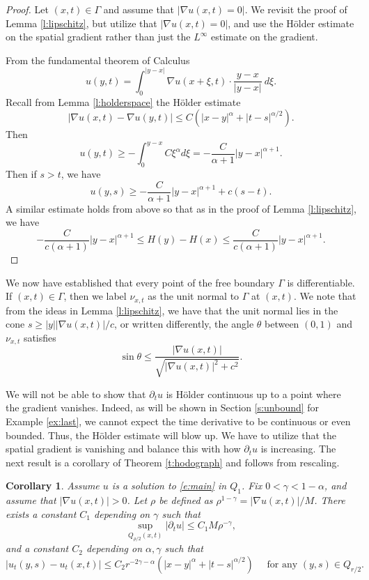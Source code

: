 \documentclass{amsart}
\newtheorem{corollary}[theorem]{Corollary}
\numberwithin{equation}{section}
\begin{document}
\begin{proof}
    Let $(x,t) \in \Gamma$ and assume that $|\nabla u(x,t)=0|$. We revisit the proof of Lemma \ref{l:lipschitz}, but utilize that $|\nabla u(x,t)=0|$, and use the H\"older estimate on the spatial gradient rather than just the $L^{\infty}$ estimate on the gradient. 
    
    From the fundamental theorem of Calculus
    \[
    u(y,t)= \int_0^{|y-x|} \nabla u(x+\xi,t) \cdot \frac{y-x}{|y-x|} \ d \xi. 
    \]
    Recall from Lemma \ref{l:holderspace} the H\"older estimate 
     \[
    |\nabla u(x,t)- \nabla u(y,t)| \leq C(|x-y|^{\alpha}+|t-s|^{\alpha/2}). 
    \]
    Then 
    \[
     u(y,t) \geq -\int_0^{y-x}C\xi^{\alpha} d \xi= -\frac{C}{\alpha+1} |y-x|^{\alpha+1}. 
    \]
    Then if $s>t$, we have 
    \[
    u(y,s)\geq -\frac{C}{\alpha+1} |y-x|^{\alpha+1}+ c(s-t). 
    \]
    A similar estimate holds from above so that as in the proof of Lemma \ref{l:lipschitz}, we have
    \begin{equation} \label{e:zeroalpha}
    -\frac{C}{c(\alpha+1)} |y-x|^{\alpha+1}\leq H(y)-H(x) \leq \frac{C}{c(\alpha+1)} |y-x|^{\alpha+1}. 
    \end{equation}
\end{proof}

We now have established that every point of the free boundary $\Gamma$ is differentiable. 
If $(x,t) \in \Gamma$, then we label $\nu_{x,t}$ as the unit normal to $\Gamma$ at $(x,t)$. We note that from the ideas in Lemma \ref{l:lipschitz}, we have that the unit normal lies in the cone $s\geq |y||\nabla u(x,t)|/c$, or written differently, the angle $\theta$ between $(0,1)$ and $\nu_{x,t}$ satisfies 
\[
\sin \theta\leq \frac{|\nabla u(x,t)|}{\sqrt{|\nabla u(x,t)|^2 + c^2}}. 
\]

We will not be able to show that $\partial_t u$ is H\"older continuous up to a point where the gradient vanishes. Indeed, as will be shown in Section \ref{s:unbound} for Example \ref{ex:last}, we cannot expect the time derivative to be continuous or even bounded. Thus, the H\"older estimate will blow up. We have to utilize that the spatial gradient is vanishing and balance this with how $\partial_t u$ is increasing. The next result is a corollary of Theorem \ref{t:hodograph} and follows from rescaling. 

\begin{corollary} \label{c:rescale}
 Assume $u$ is a solution to \eqref{e:main} in $Q_1$. Fix $0<\gamma<1-\alpha$, and assume that $|\nabla u(x,t)|>0$. Let $\rho$ be defined as $\rho^{1-\gamma}=|\nabla u(x,t)|/M$. There exists a constant $C_1$ depending on $\gamma$ such that 
 \begin{equation} \label{e:rho}
 \sup_{Q_{\rho/2}(x,t)} |\partial_t u| \leq C_1 M\rho^{-\gamma},
 \end{equation}
 and a constant $C_2$ depending on $\alpha,\gamma$ such that  
 \begin{equation} \label{e:rho2}
  | u_t(y,s)-u_t(x,t)| \leq C_2 r^{-2\gamma-\alpha} (|x-y|^{\alpha}+|t-s|^{\alpha/2}) \quad \text{ for any } (y,s) \in Q_{r/2}. 
 \end{equation}
\end{corollary}
\end{document}
